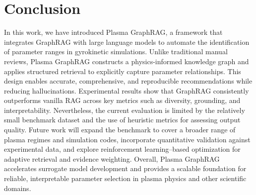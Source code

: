 \documentclass[journal]{IEEEtran}
\begin{document}
\section{Conclusion}
In this work, we have introduced Plasma GraphRAG, a framework that integrates GraphRAG with large language models to automate the identification of parameter ranges in gyrokinetic simulations. Unlike traditional manual reviews, Plasma GraphRAG constructs a physics-informed knowledge graph and applies structured retrieval to explicitly capture parameter relationships. This design enables accurate, comprehensive, and reproducible recommendations while reducing hallucinations. Experimental results show that GraphRAG consistently outperforms vanilla RAG across key metrics such as diversity, grounding, and interpretability. {Nevertheless, the current evaluation is limited by the relatively small benchmark dataset and the use of heuristic metrics for assessing output quality. Future work will expand the benchmark to cover a broader range of plasma regimes and simulation codes, incorporate quantitative validation against experimental data, and explore reinforcement learning–based optimization for adaptive retrieval and evidence weighting. Overall, Plasma GraphRAG accelerates surrogate model development and provides a scalable foundation for reliable, interpretable parameter selection in plasma physics and other scientific domains.}



\end{document}
